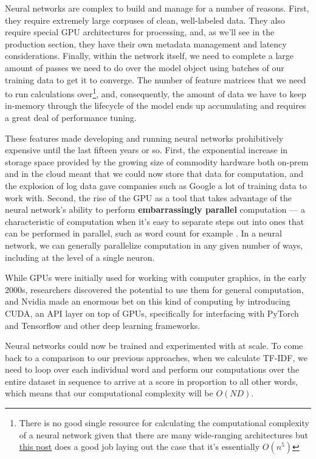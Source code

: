 \documentclass[11pt, table]{diazessay} %
\begin{document}
\begin{sloppypar}
Neural networks are complex to build and manage for a number of reasons. First, they require extremely large corpuses of clean, well-labeled data. They also require special GPU architectures for processing, and, as we'll see in the production section, they have their own metadata management and latency considerations. Finally, within the network itself, we need to complete a large amount of passes we need to do over the model object using batches of our training data to get it to converge. The number of feature matrices that we need to run calculations over\footnote{There is no good single resource for calculating the computational complexity of a neural network given that there are many wide-ranging architectures but   \href{https://lunalux.io/computational-complexity-of-neural-networks/}{this post} does a good job laying out the case that it's essentially $O(n^5)$}, and, consequently, the amount of data we have to keep in-memory through the lifecycle of the model ends up accumulating and requires a great deal of performance tuning.

These features made developing and running neural networks prohibitively expensive until the last fifteen years or so. First, the exponential increase in storage space provided by the growing size of commodity hardware both on-prem and in the cloud meant that we could now store that data for computation, and  the explosion of log data gave companies such as Google a lot of training data to work with.  Second,  the rise of the GPU as a tool that takes advantage of the neural network's ability to perform \textbf{embarrassingly parallel} computation --- a characteristic of computation when it's easy to separate steps out into ones that can be performed in parallel, such as word count for example . In a neural network, we can generally parallelize computation in any given number of ways, including at the level of a single neuron.  

While GPUs were initially used for working with computer graphics, in the early 2000s\citep{oancea2014gpgpu}, researchers discovered the potential to use them for general computation, and Nvidia made an enormous bet on this kind of computing by introducing CUDA, an API layer on top of GPUs, specifically for interfacing with PyTorch and Tensorflow and other deep learning frameworks.

Neural networks could now be trained and experimented with at scale. To come back to a comparison to our previous approaches, when we calculate TF-IDF, we need to loop over each individual word and perform our computations over the entire dataset in sequence to arrive at a score in proportion to all other words, which means that our computational complexity will be $O(N D)$\citep{cong2016novel}.  


\end{sloppypar}
\end{document}
